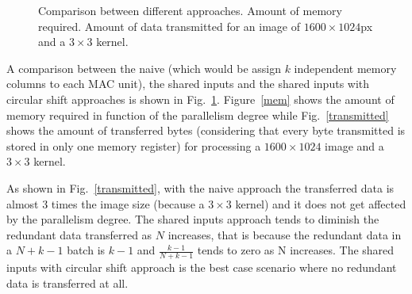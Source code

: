 \documentclass[conference,compsoc]{IEEEtran}
\begin{document}
\begin{figure}[!t]
\caption{Comparison between different approaches. \protect{} Amount of
  memory required. \protect{} Amount of data transmitted for an image of $1600\times1024$px and a $3\times3$ kernel.}
\label{comp}
\end{figure}


A comparison between the naive (which would be assign $k$ independent
memory columns to each MAC unit), the shared inputs and the
shared inputs with circular shift approaches is shown in Fig.~\ref{comp}.
Figure~\ref{mem} shows the amount of memory required in function of the
parallelism degree while Fig.~\ref{transmitted} shows the amount of transferred
bytes (considering that every byte transmitted is stored in only one memory
register) for processing a $1600\times1024$ image and a $3\times3$ kernel.

As shown in Fig.~\ref{transmitted}, with the naive approach the transferred data is
almost $3$ times the image size (because a $3\times3$ kernel) and it does not
get affected by the parallelism degree. The shared inputs approach tends to
diminish the redundant data transferred as $N$ increases, that is because the
redundant data in a $N+k-1$ batch is $k-1$ and $\frac{k-1}{N+k-1}$ tends to zero
as N increases. The shared inputs with circular shift approach is the best case
scenario where no redundant data is transferred at all.
\end{document}
